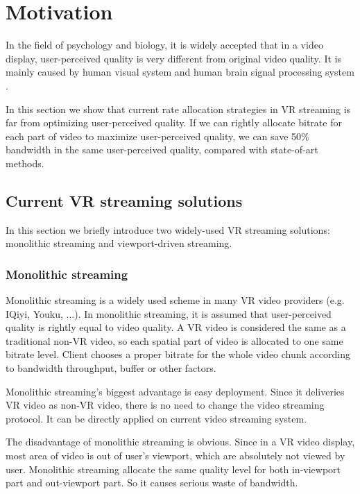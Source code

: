 \section{Motivation}

In the field of psychology and biology, it is widely accepted that in a video display, user-perceived quality is very different from original video quality. It is mainly caused by human visual system \cite{contrast_masking} \cite{letter} and human brain signal processing system \cite{brain}.

In this section we show that current rate allocation strategies in VR streaming is far from optimizing user-perceived quality. If we can rightly allocate bitrate for each part of video to maximize user-perceived quality, we can save 50\% bandwidth in the same user-perceived quality, compared with state-of-art methods.

\subsection{Current VR streaming solutions}

In this section we briefly introduce two widely-used VR streaming solutions: monolithic streaming and viewport-driven streaming.

\subsubsection{Monolithic streaming}

Monolithic streaming is a widely used scheme in many VR video providers (e.g. IQiyi, Youku, ...). In monolithic streaming, it is assumed that user-perceived quality is rightly equal to video quality. A VR video is considered the same as a traditional non-VR video, so each spatial part of video is allocated to one same bitrate level. Client chooses a proper bitrate for the whole video chunk according to bandwidth throughput, buffer or other factors.

Monolithic streaming's biggest advantage is easy deployment. Since it deliveries VR video as non-VR video, there is no need to change the video streaming protocol. It can be directly applied on current video streaming system.

The disadvantage of monolithic streaming is obvious. Since in a VR video display, most area of video is out of user's viewport, which are absolutely not viewed by user. Monolithic streaming allocate the same quality level for both in-viewport part and out-viewport part. So it causes serious waste of bandwidth. 

